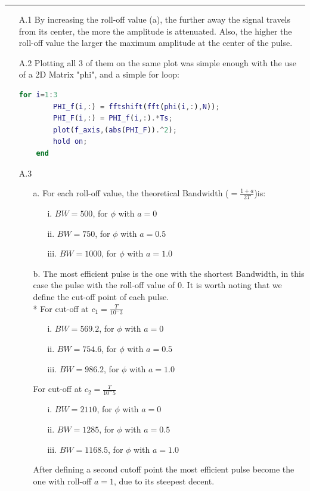 \documentclass[12pt, a4paper]{article}
\begin{document}
\noindent\rule{\textwidth}{.5pt}
\begin{enumerate}
\item[A.1]
By increasing the roll-off value (a), the further away the signal travels from its center, the more the amplitude is attenuated. Also, the higher the roll-off value the larger the maximum amplitude at the center of the pulse.

\item[A.2]
Plotting all 3 of them on the same plot was simple enough with the use of a 2D Matrix "phi", and a simple for loop:

\begin{lstlisting}[language=MATLAB]
    for i=1:3
        PHI_f(i,:) = fftshift(fft(phi(i,:),N));
        PHI_F(i,:) = PHI_f(i,:).*Ts;
        plot(f_axis,(abs(PHI_F)).^2);
        hold on;
    end
\end{lstlisting}

\item[A.3]
\begin{enumerate}
\item[a.] For each roll-off value, the theoretical Bandwidth ($=\frac{1+a}{2T}$)is:
\begin{enumerate}
\item[i.]
	$BW=500$, for $\phi$ with $a=0$
\item[ii.]
	$BW=750$, for $\phi$ with $a=0.5$
\item[iii.]
	$BW=1000$, for $\phi$ with $a=1.0$
\end{enumerate}


\item[b.]The most efficient pulse is the one with the shortest Bandwidth, in this case the pulse with the roll-off value of 0. It is worth noting that we define the cut-off point of each pulse.\\*
For cut-off at $c_1 = \frac{T}{10^-3}$
\begin{enumerate}
\item[i.]
	$BW=569.2$, for $\phi$ with $a=0$
\item[ii.]
	$BW=754.6$, for $\phi$ with $a=0.5$
\item[iii.]
	$BW=986.2$, for $\phi$ with $a=1.0$
\end{enumerate}

For cut-off at $c_2 = \frac{T}{10^-5}$
\begin{enumerate}
\item[i.]
	$BW=2110$, for $\phi$ with $a=0$
\item[ii.]
	$BW=1285$, for $\phi$ with $a=0.5$
\item[iii.]
	$BW=1168.5$, for $\phi$ with $a=1.0$
\end{enumerate}
After defining a second cutoff point the most efficient pulse become the one with roll-off $a=1$, due to its steepest decent.
\end{enumerate}
\end{enumerate}
\end{document}
